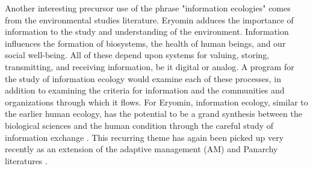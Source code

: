 Another interesting precursor use of the phrase "information ecologies" comes from the environmental studies literature. Eryomin adduces the importance of information to the study and understanding of the environment. Information influences the formation of biosystems, the health of human beings, and our social well-being. All of these depend upon systems for valuing, storing, transmitting, and receiving information, be it digital or analog. A program for the study of information ecology would examine each of these processes, in addition to examining the criteria for information and the communities and organizations through which it flows. For Eryomin, information ecology, similar to the earlier human ecology, has the potential to be a grand synthesis between the biological sciences and the human condition through the careful study of information exchange \citep{eryomin_information_1998}. This recurring theme has again been picked up very recently as an extension of the adaptive management (AM) and Panarchy literatures \citep{eddy_information_2014}.